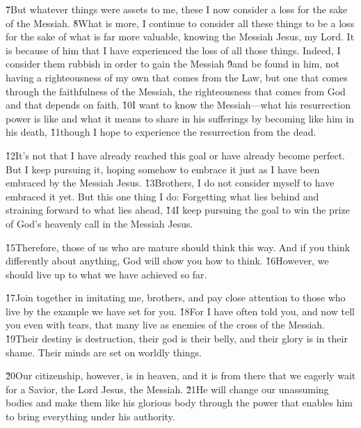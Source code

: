 \v{7}But whatever things were assets to me, these I now consider a loss for the sake of the Messiah. \v{8}What is more, I continue to consider all these things to be a loss for the sake of what is far more valuable, knowing the Messiah Jesus, my Lord. It is because of him that I have experienced the loss of all those things. Indeed, I consider them rubbish in order to gain the Messiah \v{9}and be found in him, not having a righteousness of my own that comes from the Law, but one that comes through the faithfulness of the Messiah, the righteousness that comes from God and that depends on faith. \v{10}I want to know the Messiah---what his resurrection power is like and what it means to share in his sufferings by becoming like him in his death, \v{11}though I hope to experience the resurrection from the dead.

\v{12}It's not that I have already reached this goal or have already become perfect. But I keep pursuing it, hoping somehow to embrace it just as I have been embraced by the Messiah Jesus. \v{13}Brothers, I do not consider myself to have embraced it yet. But this one thing I do: Forgetting what lies behind and straining forward to what lies ahead, \v{14}I keep pursuing the goal to win the prize of God's heavenly call in the Messiah Jesus.

\v{15}Therefore, those of us who are mature should think this way. And if you think differently about anything, God will show you how to think. \v{16}However, we should live up to what we have achieved so far.

\v{17}Join together in imitating me, brothers, and pay close attention to those who live by the example we have set for you. \v{18}For I have often told you, and now tell you even with tears, that many live as enemies of the cross of the Messiah. \v{19}Their destiny is destruction, their god is their belly, and their glory is in their shame. Their minds are set on worldly things.

\v{20}Our citizenship, however, is in heaven, and it is from there that we eagerly wait for a Savior, the Lord Jesus, the Messiah. \v{21}He will change our unassuming bodies and make them like his glorious body through the power that enables him to bring everything under his authority.

